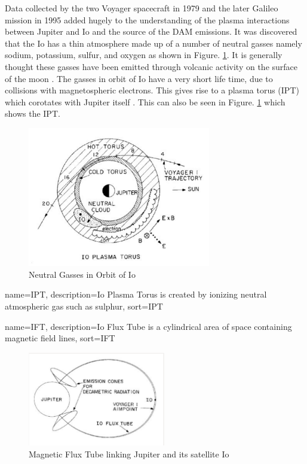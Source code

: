 \documentclass[runningheads,a4paper]{llncs}
\begin{document}
Data collected by the two Voyager spacecraft in 1979 \citep{belcher87} and the later Galileo mission in 1995 \citep{kivelson96} added hugely to the understanding of the plasma interactions between Jupiter and Io and the source of the \gls{DAM} emissions. It was discovered that the Io has a thin atmosphere made up of a number of neutral gasses namely sodium, potassium, sulfur, and oxygen as shown in Figure. \ref{fig:io_neutral_gasses}. It is generally thought these gasses have been emitted through volcanic activity on the surface of the moon \citep{belcher87}. The gasses in orbit of Io have a very short life time, due to collisions with magnetospheric electrons. This gives rise to a plasma torus (\gls{IPT}) which corotates with Jupiter itself \citep{belcher87}. This can also be seen in Figure. \ref{fig:io_neutral_gasses} which shows the \gls{IPT}.
%
\begin{figure}[here]
\centering
\includegraphics[width=8cm]{images/02}
\caption{Neutral Gasses in Orbit of Io \citep{belcher87}}
\label{fig:io_neutral_gasses}
\end{figure}
%
{
  name={IPT},
  description={Io Plasma Torus is created by ionizing neutral atmospheric gas such as sulphur},
  sort=IPT
}
%

%
{
  name={IFT},
  description={Io Flux Tube is a cylindrical area of space containing magnetic field lines},
  sort=IFT
}
%

%
\begin{figure}[here]
\centering
\includegraphics[width=6cm]{images/03}
\caption{Magnetic Flux Tube linking Jupiter and its satellite Io \citep{belcher87}}
\label{fig:io_flux_tube}
\end{figure}
%
\end{document}
